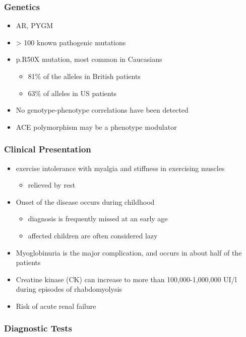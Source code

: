 \documentclass{scrartcl}
\begin{document}
\subsubsection{Genetics}
\label{sec:org008626a}
\begin{itemize}
\item AR, PYGM
\item \textgreater{} 100 known pathogenic mutations
\item p.R50X mutation, most common in Caucasians
\begin{itemize}
\item 81\% of the alleles in British patients
\item 63\% of alleles in US patients
\end{itemize}
\item No genotype-phenotype correlations have been detected
\item ACE polymorphism may be a phenotype modulator
\end{itemize}

\subsubsection{Clinical Presentation}
\label{sec:orgff2150b}
\begin{itemize}
\item exercise intolerance with myalgia and stiffness in exercising muscles
\begin{itemize}
\item relieved by rest
\end{itemize}
\item Onset of the disease occurs during childhood
\begin{itemize}
\item diagnosis is frequently missed at an early age
\item affected children are often considered lazy
\end{itemize}
\item Myoglobinuria is the major complication, and occurs in about half of
the patients
\item Creatine kinase (CK) can increase to more than 100,000-1,000,000
UI/l during episodes of rhabdomyolysis
\item Risk of acute renal failure
\end{itemize}

\subsubsection{Diagnostic Tests}
\label{sec:org56a76ca}
\end{document}
